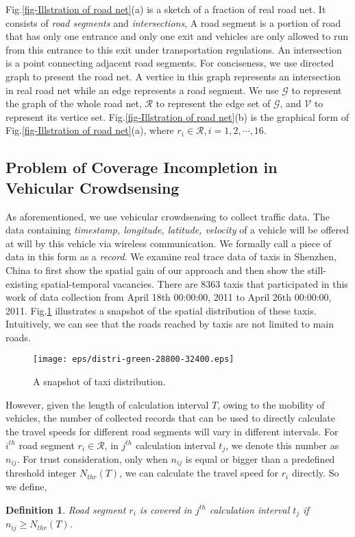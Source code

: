 \documentclass[twocolumn,10pt,final,conference]{IEEEtran}
\newtheorem{defn}{Definition}
\begin{document}
Fig.\ref{fig-Illstration of road net}(a) is a sketch of a fraction of real road net. It consists of \emph{road segments} and \emph{intersections},
A road segment is a portion of road that has only one entrance and only one exit and vehicles are only allowed to run from this entrance to this exit under transportation regulations.
An intersection is a point connecting adjacent road segments. For conciseness, we use directed graph to present the road net.  A vertice in this graph represents an intersection in real road net while an edge represents a road segment. We use $\mathcal{G}$ to represent the graph of the whole road net, $\mathcal{R}$ to represent the edge set of $\mathcal{G}$, and $\mathcal{V}$ to represent its vertice set. Fig.\ref{fig-Illstration of road net}(b) is the graphical form of Fig.\ref{fig-Illstration of road net}(a), where $r_i\in \mathcal{R}, i=1,2,\cdots,16$.

\subsection{Problem of Coverage Incompletion in Vehicular Crowdsensing}\label{section-sub-Problem of coverage incompletion in vecicular crowdsensing}
As aforementioned, we use vehicular crowdsensing to collect traffic data. The data containing \emph{timestamp, longitude, latitude, velocity} of a vehicle will be offered at will by this vehicle via wireless communication. We formally call a piece of data in this form as a \emph{record}. We examine real trace data of taxis in Shenzhen, China to first show the spatial gain of our approach and then show the still-existing spatial-temporal vacancies. There are 8363 taxis that participated in this work of data collection from April 18th 00:00:00, 2011 to April 26th 00:00:00, 2011.
Fig.\ref{fig-SnapShot of Taxi Distribution} illustrates a snapshot of the spatial distribution of these taxis. Intuitively, we can see that the roads reached by taxis are not limited to main roads.

\begin{figure}[h]
  \centering
\texttt{[image: eps/distri-green-28800-32400.eps]}
  \caption{A snapshot of taxi distribution.}
  \label{fig-SnapShot of Taxi Distribution}
\end{figure}

However, given the length of calculation interval $T$, owing to the mobility of vehicles, the number of collected records that can be used to directly calculate the travel speeds for different road segments will vary in different intervals. For $i^{th}$ road segment $r_i\in\mathcal{R}$, in $j^{th}$ calculation interval $t_j$, we denote this number as $n_{ij}$.
For trust consideration, only when $n_{ij}$ is equal or bigger than a predefined threshold integer $N_{thr}(T)$, we can calculate the travel speed for $r_i$ directly.
So we define,
\begin{defn}\label{defn-Covered}
Road segment $r_i$ is \emph{covered} in $j^{th} $ calculation interval $t_j$ if $n_{ij}\geqslant N_{thr}(T)$.
\end{defn}
\end{document}
